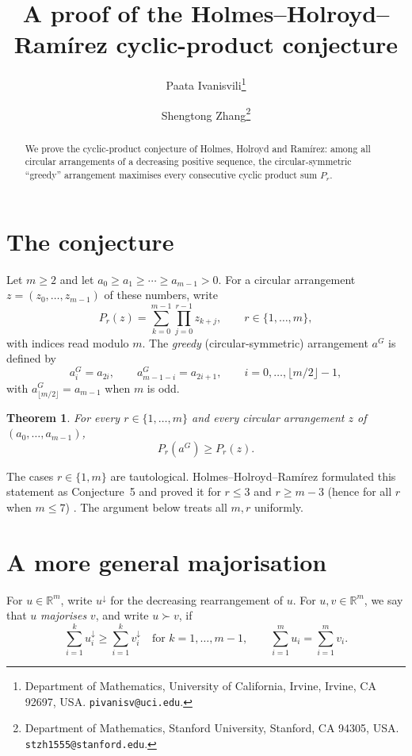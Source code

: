 \documentclass[11pt]{article}
\title{A proof of the Holmes--Holroyd--Ram\'irez cyclic-product conjecture}
\author{%
  Paata Ivanisvili\thanks{Department of Mathematics, University of California, Irvine, Irvine, CA 92697, USA.
  \texttt{pivanisv@uci.edu}.}
  \and
  Shengtong Zhang\thanks{Department of Mathematics, Stanford University, Stanford, CA 94305, USA.
  \texttt{stzh1555@stanford.edu}.}
}
\date{}
\newtheorem{theorem}{Theorem}[section]
\theoremstyle{definition}
\newcommand{\R}{\mathbb{R}}
\begin{document}
\maketitle

\begin{abstract}
We prove the cyclic-product conjecture of Holmes, Holroyd and Ram\'irez: among all circular arrangements of a decreasing positive sequence, the circular-symmetric ``greedy'' arrangement maximises every consecutive cyclic product sum $P_r$.
\end{abstract}

\section{The conjecture}

Let $m\ge 2$ and let $a_0\ge a_1\ge\cdots\ge a_{m-1}>0$. For a circular arrangement $z=(z_0,\dots,z_{m-1})$ of these numbers, write
\[
P_r(z)=\sum_{k=0}^{m-1}\prod_{j=0}^{r-1}z_{k+j},
\qquad r\in\{1,\dots,m\},
\]
with indices read modulo $m$. The \emph{greedy} (circular-symmetric) arrangement $a^G$ is defined by
\begin{equation}\label{eq:greedy}
 a^G_i=a_{2i},\qquad a^G_{m-1-i}=a_{2i+1},
 \qquad i=0,\dots,\bigl\lfloor m/2\bigr\rfloor-1,
\end{equation}
with $a^G_{\lfloor m/2\rfloor}=a_{m-1}$ when $m$ is odd.

\begin{theorem}\label{thm:main}
For every $r\in\{1,\dots,m\}$ and every circular arrangement $z$ of $(a_0,\dots,a_{m-1})$,
\[
P_r(a^G)\ge P_r(z).
\]
\end{theorem}

The cases $r\in\{1,m\}$ are tautological. Holmes--Holroyd--Ram\'irez formulated this statement as Conjecture~5 and proved it for $r\le3$ and $r\ge m-3$ (hence for all $r$ when $m\le7$) \cite[Conjecture~5 and Theorem~6]{HHR}. The argument below treats all $m,r$ uniformly.

\section{A more general majorisation}

For $u\in\R^m$, write $u^\downarrow$ for the decreasing rearrangement of $u$. For $u,v\in\R^m$, we say that $u$ \emph{majorises} $v$, and write $u\succ v$, if
\[
\sum_{i=1}^k u_i^\downarrow\ge \sum_{i=1}^k v_i^\downarrow
\quad\text{for }k=1,\dots,m-1,
\qquad
\sum_{i=1}^m u_i=\sum_{i=1}^m v_i.
\]
\end{document}
